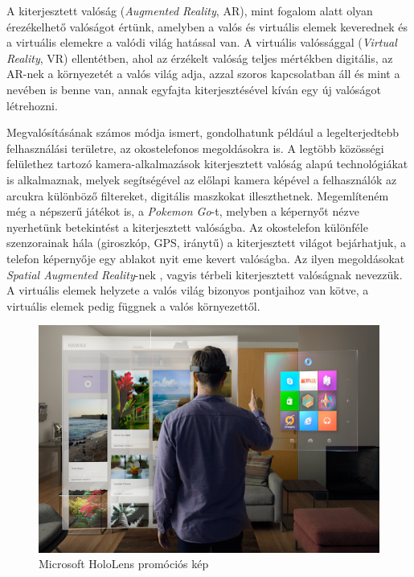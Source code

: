 


A kiterjesztett valóság (\textit{Augmented Reality}, AR), mint fogalom alatt olyan érezékelhető valóságot értünk, amelyben a valós és virtuális elemek keverednek és a virtuális elemekre a valódi világ hatással van. A virtuális valóssággal (\textit{Virtual Reality}, VR) ellentétben, ahol az érzékelt valóság teljes mértékben digitális, az AR-nek a környezetét a valós világ adja, azzal szoros kapcsolatban áll és mint a nevében is benne van, annak egyfajta kiterjesztésével kíván egy új valóságot létrehozni.

Megvalósításának számos módja ismert, gondolhatunk például a legelterjedtebb felhasználási területre, az okostelefonos megoldásokra is. A legtöbb közösségi felülethez tartozó kamera-alkalmazások kiterjesztett valóság alapú technológiákat is alkalmaznak, melyek segítségével az előlapi kamera képével a felhasználók az arcukra különböző filtereket, digitális maszkokat illeszthetnek. Megemlíteném még a népszerű játékot is, a \textit{Pokemon Go}-t, melyben a képernyőt nézve nyerhetünk betekintést a kiterjesztett valóságba. Az okostelefon különféle szenzorainak hála (giroszkóp, GPS, iránytű) a kiterjesztett világot bejárhatjuk, a telefon képernyője egy ablakot nyit eme kevert valóságba. Az ilyen megoldásokat \textit{Spatial Augmented Reality}-nek \cite{bimber2005spatial}, vagyis térbeli kiterjesztett valóságnak nevezzük. A virtuális elemek helyzete a valós világ bizonyos pontjaihoz van kötve, a virtuális elemek pedig függnek a valós környezettől.

\begin{figure}[h]
\centering
\includegraphics[width=10.3truecm, height=6.28truecm]{images/AR-hololens.png}
\caption{Microsoft HoloLens promóciós kép}
\label{fig:hololens}
\end{figure}

